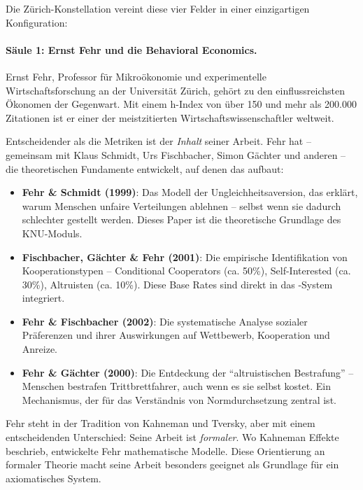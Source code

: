 Die Zürich-Konstellation vereint diese vier Felder in einer einzigartigen Konfiguration:

\paragraph{Säule 1: Ernst Fehr und die Behavioral Economics.}

Ernst Fehr, Professor für Mikroökonomie und experimentelle Wirtschaftsforschung an der Universität Zürich, gehört zu den einflussreichsten Ökonomen der Gegenwart. Mit einem h-Index von über 150 und mehr als 200.000 Zitationen ist er einer der meistzitierten Wirtschaftswissenschaftler weltweit.

Entscheidender als die Metriken ist der \textit{Inhalt} seiner Arbeit. Fehr hat -- gemeinsam mit Klaus Schmidt, Urs Fischbacher, Simon Gächter und anderen -- die theoretischen Fundamente entwickelt, auf denen das \BCM{} aufbaut:

\begin{itemize}
    \item \textbf{Fehr \& Schmidt (1999)}: Das Modell der Ungleichheitsaversion, das erklärt, warum Menschen unfaire Verteilungen ablehnen -- selbst wenn sie dadurch schlechter gestellt werden. Dieses Paper ist die theoretische Grundlage des KNU-Moduls.

    \item \textbf{Fischbacher, Gächter \& Fehr (2001)}: Die empirische Identifikation von Kooperationstypen -- Conditional Cooperators (ca. 50\%), Self-Interested (ca. 30\%), Altruisten (ca. 10\%). Diese Base Rates sind direkt in das \BEATRIX-System integriert.

    \item \textbf{Fehr \& Fischbacher (2002)}: Die systematische Analyse sozialer Präferenzen und ihrer Auswirkungen auf Wettbewerb, Kooperation und Anreize.

    \item \textbf{Fehr \& Gächter (2000)}: Die Entdeckung der ``altruistischen Bestrafung'' -- Menschen bestrafen Trittbrettfahrer, auch wenn es sie selbst kostet. Ein Mechanismus, der für das Verständnis von Normdurchsetzung zentral ist.
\end{itemize}

Fehr steht in der Tradition von Kahneman und Tversky, aber mit einem entscheidenden Unterschied: Seine Arbeit ist \textit{formaler}. Wo Kahneman Effekte beschrieb, entwickelte Fehr mathematische Modelle. Diese Orientierung an formaler Theorie macht seine Arbeit besonders geeignet als Grundlage für ein axiomatisches System.

